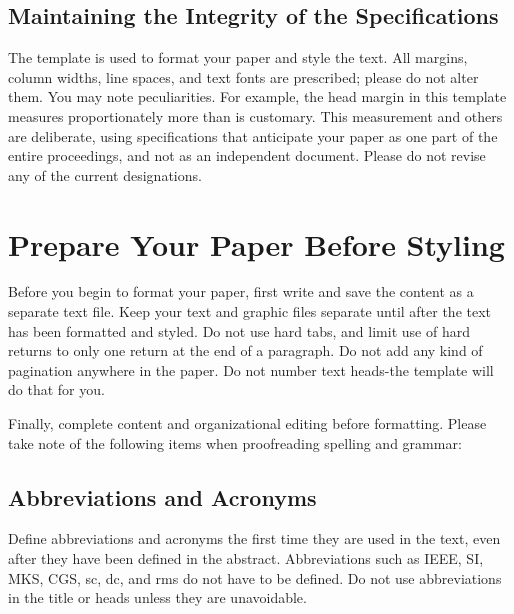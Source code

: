 \documentclass[conference,flushend]{iaria-lite}
\begin{document}
\subsection{Maintaining the Integrity of the Specifications}
The template is used to format your paper and style the text. All margins, column widths, line spaces, and text fonts are prescribed; please do not alter them. You may note peculiarities. For example, the head margin in this template measures proportionately more than is customary. This measurement and others are deliberate, using specifications that anticipate your paper as one part of the entire proceedings, and not as an independent document. Please do not revise any of the current designations.

\section{Prepare Your Paper Before Styling}

Before you begin to format your paper, first write and save the content as a separate text file. Keep your text and graphic files separate until after the text has been formatted and styled. Do not use hard tabs, and limit use of hard returns to only one return at the end of a paragraph. Do not add any kind of pagination anywhere in the paper. Do not number text heads-the template will do that for you.

Finally, complete content and organizational editing before formatting. Please take note of the following items when proofreading spelling and grammar:

\subsection{Abbreviations and Acronyms}
Define abbreviations and acronyms the first time they are used in the text, even after they have been defined in the abstract. Abbreviations such as IEEE, SI, MKS, CGS, sc, dc, and rms do not have to be defined. Do not use abbreviations in the title or heads unless they are unavoidable.
\end{document}
